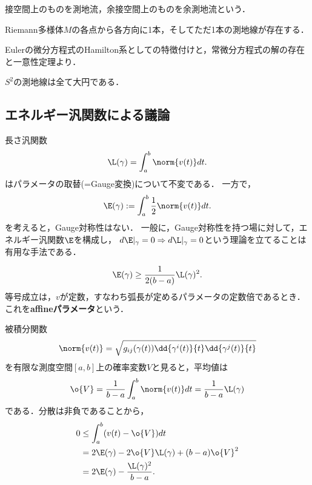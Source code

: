 \documentclass[uplatex,dvipdfmx]{jsreport}
\begin{document}
\begin{remarks}
    接空間上のものを測地流，余接空間上のものを余測地流という．
\end{remarks}

\begin{corollary}
    Riemann多様体$M$の各点から各方向に1本，そしてただ1本の測地線が存在する．
\end{corollary}
\begin{Proof}
    Eulerの微分方程式のHamilton系としての特徴付けと，常微分方程式の解の存在と一意性定理より．
\end{Proof}

\begin{example}
    $S^2$の測地線は全て大円である．
\end{example}

\subsection{エネルギー汎関数による議論}

\begin{tcolorbox}[colframe=ForestGreen, colback=ForestGreen!10!white,breakable,colbacktitle=ForestGreen!40!white,coltitle=black,fonttitle=\bfseries\sffamily,
title=]
    
\end{tcolorbox}

\begin{observation}
    長さ汎関数
    \[\L(\gamma)=\int^b_a\norm{v(t)}dt.\]
    はパラメータの取替(=Gauge変換)について不変である．
    一方で，
    \[\E(\gamma):=\int^b_a\frac{1}{2}\norm{v(t)}dt.\]
    を考えると，Gauge対称性はない．
    一般に，Gauge対称性を持つ場に対して，エネルギー汎関数$\E$を構成し，
    $d\E|_{\gamma}=0\Rightarrow d\L|_\gamma=0$という理論を立てることは
    有用な手法である．
\end{observation}

\begin{proposition}
    \[\E(\gamma)\ge\frac{1}{2(b-a)}\L(\gamma)^2.\]
    等号成立は，$v$が定数，すなわち弧長が定めるパラメータの定数倍であるとき．
    これを\textbf{affineパラメータ}という．
\end{proposition}
\begin{Proof}
    被積分関数
    \[\norm{v(t)}=\sqrt{g_{ij}(\gamma(t))\dd{\gamma^i(t)}{t}\dd{\gamma^j(t)}{t}}\]
    を有限な測度空間$[a,b]$上の確率変数$V$と見ると，平均値は
    \[\o{V}=\frac{1}{b-a}\int^b_a\norm{v(t)}dt=\frac{1}{b-a}\L(\gamma)\]
    である．分散は非負であることから，
    \begin{align*}
        0&\le\int^b_a(v(t)-\o{V})dt\\
        &=2\E(\gamma)-2\o{V}\L(\gamma)+(b-a)\o{V}^2\\
        &=2\E(\gamma)-\frac{\L(\gamma)^2}{b-a}.
    \end{align*}
\end{Proof}
\end{document}
